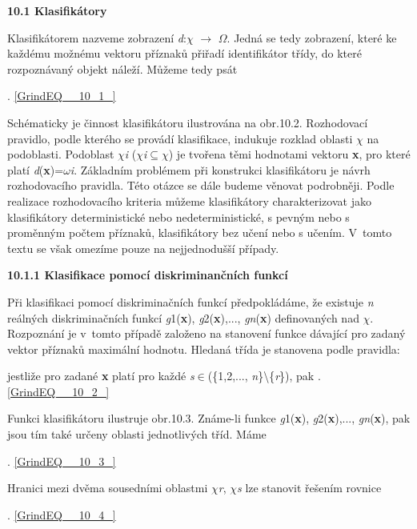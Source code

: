 \noindent \textbf{10.1 Klasifikátory}

\noindent Klasifikátorem nazveme zobrazení  \textit{d}:$\chi$ $\rightarrow$ $\Omega$. Jedná se tedy zobrazení, které ke každému možnému vektoru příznaků přiřadí identifikátor třídy, do které rozpoznávaný objekt náleží. Můžeme tedy psát

\noindent 

 . \eqref{GrindEQ__10_1_}

\noindent Schématicky je činnost klasifikátoru ilustrována na obr.10.2. Rozhodovací pravidlo, podle kterého se provádí klasifikace, indukuje rozklad oblasti $\chi$ na podoblasti. Podoblast $\chi$\textit{i} ($\chi$\textit{i}$\subseteq$$\chi$) je tvořena těmi hodnotami vektoru \textbf{x}, pro které platí \textit{d}(\textbf{x})=$\omega$\textit{i}. Základním problémem při konstrukci klasifikátoru je návrh rozhodovacího pravidla. Této otázce se dále budeme věnovat podrobněji. Podle realizace rozhodovacího kriteria můžeme klasifikátory charakterizovat jako klasifikátory deterministické nebo nedeterministické, s pevným nebo s proměnným počtem příznaků, klasifikátory bez učení nebo s učením. V~tomto textu se však omezíme pouze na nejjednodušší případy.

\noindent 

\noindent \textbf{10.1.1  Klasifikace pomocí diskriminančních funkcí}

\noindent Při klasifikaci pomocí diskriminačních funkcí předpokládáme, že existuje \textit{n} reálných diskriminačních funkcí \textit{g}1(\textbf{x}), \textit{g}2(\textbf{x}),..., \textit{gn}(\textbf{x}) definovaných nad \textit{$\chi$}. Rozpoznání je v~tomto případě založeno na stanovení funkce dávající pro zadaný vektor příznaků maximální hodnotu. Hledaná třída je stanovena podle pravidla:

 jestliže pro zadané \textbf{x} platí  pro každé \textit{s}$\in$(\{1,2,..., \textit{n}\}\textbackslash \{\textit{r}\}), pak . \eqref{GrindEQ__10_2_}

\noindent 

\noindent Funkci klasifikátoru ilustruje obr.10.3. Známe-li funkce \textit{g}1(\textbf{x}), \textit{g}2(\textbf{x}),..., \textit{gn}(\textbf{x}), pak jsou tím také určeny oblasti jednotlivých tříd. Máme

 . \eqref{GrindEQ__10_3_}

\noindent Hranici mezi dvěma sousedními oblastmi $\chi$\textit{r}, $\chi$\textit{s} lze stanovit řešením rovnice

 . \eqref{GrindEQ__10_4_}

